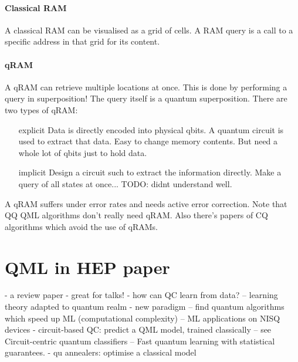 \paragraph{Classical RAM} A classical RAM can be visualised as a grid of cells.
A RAM query is a call to a specific address in that grid for its content.
\paragraph{qRAM} A qRAM can retrieve multiple locations at once. This is done by
performing a query in superposition! The query itself is a quantum
superposition.
There are two types of qRAM:
\begin{itemize}
  \item[explicit] Data is directly encoded into physical qbits. A quantum
	circuit is used to extract that data. Easy to change memory contents. But need a
	whole lot of qbits just to hold data.
  \item[implicit] Design a circuit such to extract the information directly.
	Make a query of all states at once... TODO: didnt understand well.
\end{itemize}
A qRAM suffers under error rates and needs active error correction. Note that QQ
QML algorithms don't really need qRAM. Also there's papers of CQ algorithms
which avoid the use of qRAMs.



\section{QML in HEP paper}
- a review paper - great for talks!
- how can QC learn from data?
-- learning theory adapted to quantum realm - new paradigm
-- find quantum algorithms which speed up ML (computational complexity)
-- ML applications on NISQ devices
- circuit-based QC: predict a QML model, trained classically
-- see Circuit-centric quantum classifiers
-- Fast quantum learning with statistical guarantees.
- qu annealers: optimise a classical model 

